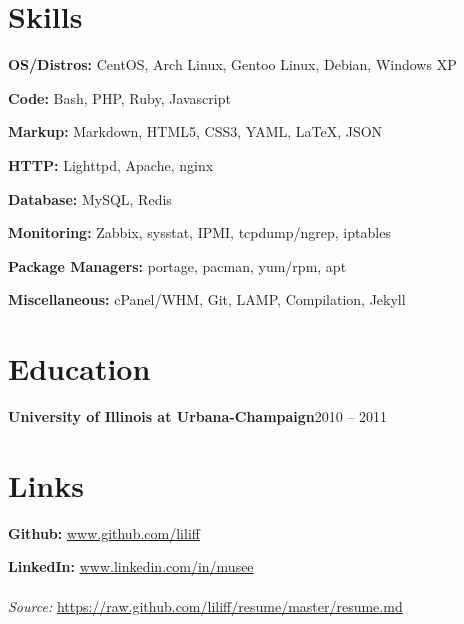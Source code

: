\documentclass{article}
\newenvironment{entity}[2]{%
    \textbf{#1}\hfill #2\par
}{
    \vspace{0.1em}%
    \par%
}
\begin{document}
\section{Skills}

\textbf{OS/Distros:} CentOS, Arch Linux, Gentoo Linux, Debian, Windows XP\par
\textbf{Code:} Bash, PHP, Ruby, Javascript\par
\textbf{Markup:} Markdown, HTML5, CSS3, YAML, \LaTeX, JSON\par
\textbf{HTTP:} Lighttpd, Apache, nginx\par
\textbf{Database:} MySQL, Redis\par
\textbf{Monitoring:} Zabbix, sysstat, IPMI, tcpdump/ngrep, iptables\par
\textbf{Package Managers:} portage, pacman, yum/rpm, apt\par
\textbf{Miscellaneous:} cPanel/WHM, Git, LAMP, Compilation, Jekyll
\section{Education}

    \begin{entity}{University of Illinois at Urbana-Champaign}{2010 -- 2011}


    \end{entity}
\section{Links}

\textbf{Github:} \url{www.github.com/liliff}\par
\textbf{LinkedIn:} \url{www.linkedin.com/in/musee}
\\
\\
\textsl{Source:} \url{https://raw.github.com/liliff/resume/master/resume.md}
\end{document}
